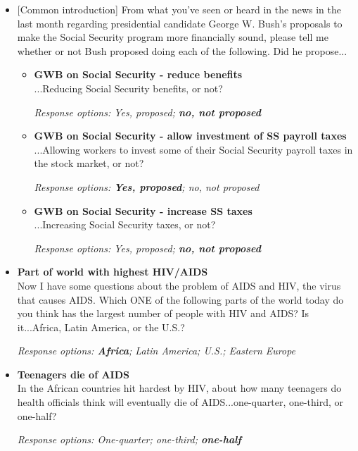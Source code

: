 \documentclass[12pt, letterpaper]{article}
\begin{document}
\begin{itemize}
\item{[Common introduction] From what you've seen or heard in the news in the last month regarding presidential candidate George W. Bush's proposals to make the Social Security program more financially sound, please tell me whether or not Bush proposed doing each of the following. Did he propose...

   \begin{itemize}
\item \textbf{GWB on Social Security - reduce benefits} \\
...Reducing Social Security benefits, or not?

\textit{Response options: Yes, proposed; \textbf{no, not proposed}}
\end{itemize}

   \begin{itemize}
\item \textbf{GWB on Social Security - allow investment of SS payroll taxes } \\
...Allowing workers to invest some of their Social Security payroll taxes in the stock market, or not?

\textit{Response options: \textbf{Yes, proposed}; no, not proposed}
\end{itemize}

   \begin{itemize}
\item \textbf{GWB on Social Security - increase SS taxes} \\
...Increasing Social Security taxes, or not?

\textit{Response options: Yes, proposed; \textbf{no, not proposed}}
\end{itemize}}
\end{itemize}

   \begin{itemize}
\item \textbf{Part of world with highest HIV/AIDS} \\
Now I have some questions about the problem of AIDS and HIV, the virus that causes AIDS. Which ONE of the following parts of the world today do you think has the largest number of people with HIV and AIDS? Is it...Africa, Latin America, or the U.S.? 

\textit{Response options: \textbf{Africa}; Latin America; U.S.; Eastern Europe}
\end{itemize}

   \begin{itemize}
\item \textbf{Teenagers die of AIDS} \\
In the African countries hit hardest by HIV, about how many teenagers do health officials think will eventually die of AIDS...one-quarter, one-third, or one-half?

\textit{Response options: One-quarter; one-third; \textbf{one-half}}
\end{itemize}
\end{document}
